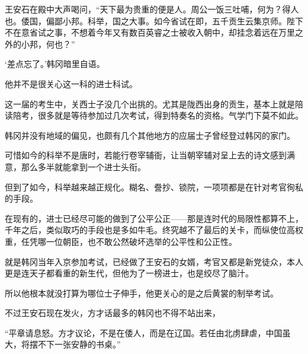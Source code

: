 王安石在殿中大声喝问，“天下最为贵重的便是人。周公一饭三吐哺，何为？得人也。倭国，偏鄙小邦。科举，国之大事。如今省试在即，五千贡生云集京师。陛下不在意省试之事，不想着今年又有数百英睿之士被收入朝中，却挂念着远在万里之外的小邦，何也？”

‘差点忘了。’韩冈暗里自语。

他并不是很关心这一科的进士科试。

这一届的考生中，关西士子没几个出挑的。尤其是陇西出身的贡生，基本上就是陪读陪考，很多就是等待参加过几次考试，得到特奏名的资格。气学门下莫不如此。

韩冈并没有地域的偏见，也颇有几个其他地方的应届士子曾经登过韩冈的家门。

可惜如今的科举不是唐时，若能行卷宰辅衙，让当朝宰辅对呈上去的诗文感到满意，那么多半就能拿到一个进士头衔。

但到了如今，科举越来越正规化。糊名、誊抄、锁院，一项项都是在针对考官徇私的手段。

在现有的，进士已经尽可能的做到了公平公正——那是连时代的局限性都算不上，千年之后，类似取巧的手段也是多如牛毛。终究越不了最后的关卡，而纵使位高权重，任凭哪一位朝臣，也不敢公然破坏选举的公平性和公正性。

就是韩冈当年入京参加考试，已经做了王安石的女婿，考官又都是新党徒众，本人更是连天子都看重的新生代，但他为了一榜进士，也是绞尽了脑汁。

所以他根本就没打算为哪位士子伸手，他更关心的是之后黄裳的制举考试。

不过王安石现在发火，方才话最多的韩冈也不得不站出来，

“平章请息怒。方才议论，不是在倭人，而是在辽国。若任由北虏肆虐，中国虽大，将摆不下一张安静的书桌。”
